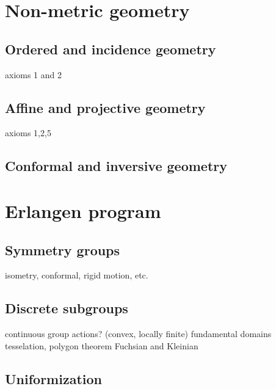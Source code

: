 \documentclass{../../large}
\begin{document}
\part{Non-metric geometry}
\chapter{Ordered and incidence geometry}
axioms 1 and 2
\chapter{Affine and projective geometry}
axioms 1,2,5
\chapter{Conformal and inversive geometry}

\part{Erlangen program}
\chapter{Symmetry groups}
isometry, conformal, rigid motion, etc.
\chapter{Discrete subgroups}
continuous group actions?
(convex, locally finite) fundamental domains
tesselation, polygon theorem
Fuchsian and Kleinian
\chapter{Uniformization}
\end{document}
